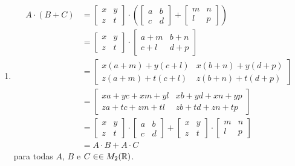 \documentclass[12pt]{exam}
\begin{document}
\begin{enumerate}[label={\roman*})]
    \item
    \begin{align*}
        A\cdot(B + C) &= \begin{bmatrix}
        x & y\\z & t 
    \end{bmatrix}\cdot\left(\begin{bmatrix}
        a & b\\c & d 
    \end{bmatrix} + \begin{bmatrix}
        m & n\\
        l & p
    \end{bmatrix}\right)\\ &= \begin{bmatrix}
        x & y\\z & t 
    \end{bmatrix}\cdot \begin{bmatrix}
        a + m & b + n\\
        c + l & d + p
    \end{bmatrix}\\ &= \begin{bmatrix}
        x(a + m) + y(c + l) & x(b + n) + y(d + p)\\
        z(a + m) + t(c + l) & z(b + n) + t(d + p)
    \end{bmatrix}\\ &= \begin{bmatrix}
        xa + yc + xm + yl & xb + yd + xn + yp\\
        za + tc + zm + tl & zb + td + zn + tp
    \end{bmatrix}\\ &= \begin{bmatrix}
        x & y\\z & t 
    \end{bmatrix}\cdot \begin{bmatrix}
        a & b\\c & d 
    \end{bmatrix} + \begin{bmatrix}
        x & y\\z & t 
    \end{bmatrix}\cdot \begin{bmatrix}
        m & n\\
        l & p
    \end{bmatrix}\\ &= A\cdot B + A \cdot C
    \end{align*}
    para todas $A$, $B$ e $C \in \in M_2(\mathbb{R})$.
\end{enumerate}
\end{document}
